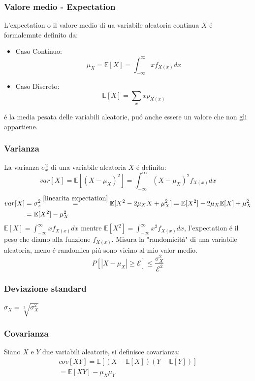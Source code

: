         \subsubsection{Valore medio - Expectation}
            L'expectation o il valore medio di ua variabile aleatoria continua $X$ é formalemnte definito da:
            \begin{itemize}
                \item {Caso Continuo:
                    \[
                        \mu_X = \mathbb{E}[X] = \int_{-\infty}^{\infty} xf_{X(x)}dx
                    \]
                }
                \item {Caso Discreto:
                    \[
                        \mathbb{E}[X] = \sum_{x}xp_{X(x)}
                    \]
                }
            \end{itemize}
            é la media pesata delle variabili aleatorie, puó anche essere un valore che non gli appartiene.
        \subsubsection{Varianza}
            La varianza $\sigma^2_x$ di una variabile aleatoria $X$ é definita:
            \[
                var[X] = \mathbb{E}[(X-\mu_X)^2] = \int_{-\infty}^{\infty} (X-\mu_X)^2f_{X(x)}dx
            \]  
            \begin{align}
                var[X] &= \sigma^2_x \overset{\ref{linearita expectation}}{=} \mathbb{E}[X^2-2\mu_XX+\mu_X^2] = \mathbb{E}[X^2]-2\mu_X\mathbb{E}[X]+\mu_X^2 \nonumber \\
                        &= \mathbb{E}[X^2]-\mu_X^2 \nonumber 
            \end{align}
            $\mathbb{E}[X] = \int_{-\infty}^{\infty} xf_{X(x)}dx$ mentre $\mathbb{E}[X^2] = \int_{-\infty}^{\infty} x^2f_{X(x)}dx$, l'expectation é il peso che diamo alla funzione $f_{X(x)}$.  
            Misura la "randomicitá" di una variabile aleatoria, meno é randomica piú sono vicino al mio valor medio.
            \[
                P[|X-\mu_X|\geq \mathcal{E}]\leq \frac{\sigma^2_X}{\mathcal{E}^2}
            \]
        \subsubsection{Deviazione standard}
            $\sigma_X = \sqrt[2]{\sigma^2_X}$
        \subsubsection{Covarianza}  
            Siano $X$ e $Y$ due variabili aleatorie, si definisce covarianza:
            \begin{gather}
                cov[XY] = \mathbb{E}[(X-\mathbb{E}[X])(Y-\mathbb{E}[Y])]\nonumber\\
                = \mathbb{E}[XY]-\mu_X\mu_Y\nonumber
            \end{gather}
